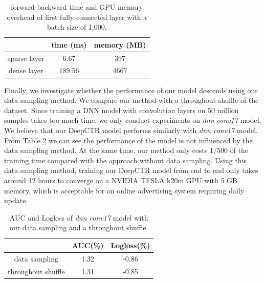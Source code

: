 \documentclass{sig-alternate}
\begin{document}
\begin{table}
	\centering
	\caption{forward-backward time and GPU memory overhead of first fully-connected layer with a batch size of 1,000.}
	\label{table:time&memory}
	\begin{tabular}{|c|c|c|} \hline
		& time (ms) & memory (MB)\\ \hline
		sparse layer & 6.67 &397 \\ \hline
		dense layer & 189.56 &4667 \\ \hline
	\end{tabular}
\end{table}

Finally, we investigate whether the performance of our model descends using our data sampling method. We compare our method with a throughout shuffle of the dataset. Since training a DNN model with convolution layers on 50 million samples takes too much time, we only conduct experiments on  \emph{dnn conv17} model. We believe that our  DeepCTR model performs similarly with \emph{dnn conv17} model. From Table \ref{table:datasampling} we can see the performance of the model is not influenced by the data sampling method. At the same time, our method only costs 1/500 of the training time compared with the approach without data sampling. Using this data sampling method, training our DeepCTR model from end to end only takes around 12 hours to converge on a NVIDIA TESLA k20m GPU with 5 GB memory, which is acceptable for an online advertising system requiring daily update. 
\begin{table}
	\centering
	\caption{AUC and Logloss of \emph{dnn conv17} model with our data sampling and a throughout shuffle.}
	\label{table:datasampling}
	\begin{tabular}{|c|c|c|} \hline
		& AUC(\%) & Logloss(\%)\\ \hline
		data sampling & 1.32 & -0.86\\ \hline
		throughout shuffle & 1.31 & -0.85\\ \hline
	\end{tabular}
\end{table}
\end{document}
